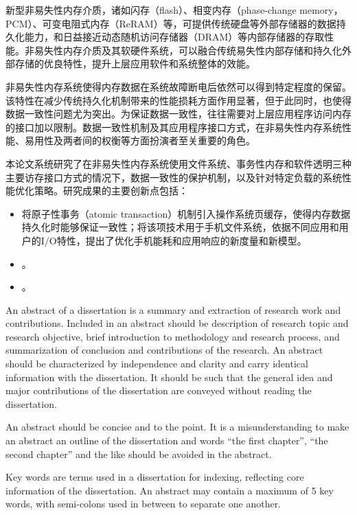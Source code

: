 \begin{cabstract}
    新型非易失性内存介质，诸如闪存（flash）、相变内存（phase-change
memory，PCM）、可变电阻式内存（ReRAM）等，可提供传统硬盘等外部存储器的数据持久化能力，和日益接近动态随机访问存储器（DRAM）等内部存储器的存取性能。非易失性内存介质及其软硬件系统，可以融合传统易失性内部存储和持久化外部存储的优良特性，提升上层应用软件和系统整体的效能。

    非易失性内存系统使得内存数据在系统故障断电后依然可以得到特定程度的保留。该特性在减少传统持久化机制带来的性能损耗方面作用显著，但于此同时，也使得数据一致性问题尤为突出。为保证数据一致性，往往需要对上层应用程序访问内存的接口加以限制。数据一致性机制及其应用程序接口方式，在非易失性内存系统性能、易用性及两者间的权衡等方面扮演者至关重要的角色。

    本论文系统研究了在非易失性内存系统使用文件系统、事务性内存和软件透明三种主要访存接口方式的情况下，数据一致性的保护机制，以及针对特定负载的系统性能优化策略。研究成果的主要创新点包括：

  \begin{itemize}
    \item 将原子性事务（atomic transaction）机制引入操作系统页缓存，使得内存数据持久化时能够保证一致性；将该项技术用于手机文件系统，依据不同应用和用户的I/O特性，提出了优化手机能耗和应用响应的新度量和新模型。
    \item 。
    \item 。
  \end{itemize}

\end{cabstract}


\begin{eabstract}
   An abstract of a dissertation is a summary and extraction of research work
   and contributions. Included in an abstract should be description of research
   topic and research objective, brief introduction to methodology and research
   process, and summarization of conclusion and contributions of the
   research. An abstract should be characterized by independence and clarity and
   carry identical information with the dissertation. It should be such that the
   general idea and major contributions of the dissertation are conveyed without
   reading the dissertation.

   An abstract should be concise and to the point. It is a misunderstanding to
   make an abstract an outline of the dissertation and words ``the first
   chapter'', ``the second chapter'' and the like should be avoided in the
   abstract.

   Key words are terms used in a dissertation for indexing, reflecting core
   information of the dissertation. An abstract may contain a maximum of 5 key
   words, with semi-colons used in between to separate one another.
\end{eabstract}


